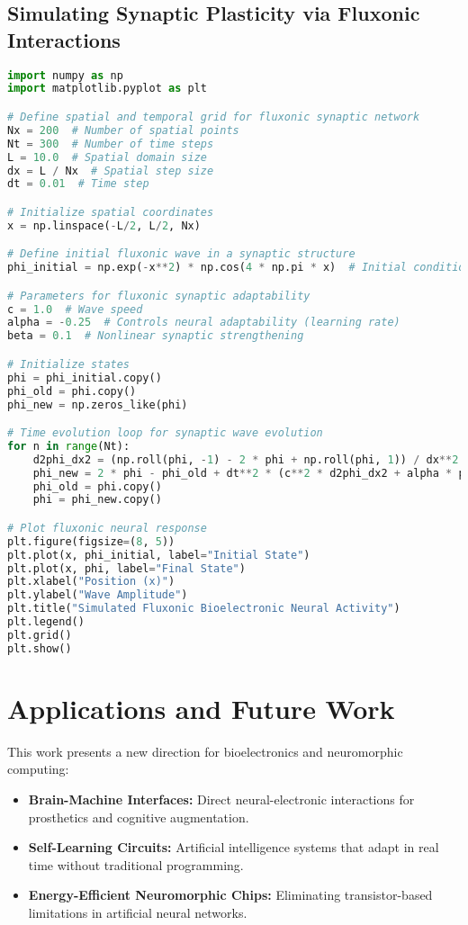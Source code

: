 \documentclass{article}
\begin{document}
\subsection{Simulating Synaptic Plasticity via Fluxonic Interactions}
\begin{lstlisting}[language=Python, caption=Simulating Synaptic Plasticity via Fluxonic Interactions, label=lst:synapse]
import numpy as np
import matplotlib.pyplot as plt

# Define spatial and temporal grid for fluxonic synaptic network
Nx = 200  # Number of spatial points
Nt = 300  # Number of time steps
L = 10.0  # Spatial domain size
dx = L / Nx  # Spatial step size
dt = 0.01  # Time step

# Initialize spatial coordinates
x = np.linspace(-L/2, L/2, Nx)

# Define initial fluxonic wave in a synaptic structure
phi_initial = np.exp(-x**2) * np.cos(4 * np.pi * x)  # Initial condition simulating an active synapse

# Parameters for fluxonic synaptic adaptability
c = 1.0  # Wave speed
alpha = -0.25  # Controls neural adaptability (learning rate)
beta = 0.1  # Nonlinear synaptic strengthening

# Initialize states
phi = phi_initial.copy()
phi_old = phi.copy()
phi_new = np.zeros_like(phi)

# Time evolution loop for synaptic wave evolution
for n in range(Nt):
    d2phi_dx2 = (np.roll(phi, -1) - 2 * phi + np.roll(phi, 1)) / dx**2  # Periodic boundary conditions
    phi_new = 2 * phi - phi_old + dt**2 * (c**2 * d2phi_dx2 + alpha * phi + beta * phi**3)
    phi_old = phi.copy()
    phi = phi_new.copy()

# Plot fluxonic neural response
plt.figure(figsize=(8, 5))
plt.plot(x, phi_initial, label="Initial State")
plt.plot(x, phi, label="Final State")
plt.xlabel("Position (x)")
plt.ylabel("Wave Amplitude")
plt.title("Simulated Fluxonic Bioelectronic Neural Activity")
plt.legend()
plt.grid()
plt.show()
\end{lstlisting}

\section{Applications and Future Work}
This work presents a new direction for bioelectronics and neuromorphic computing:
\begin{itemize}
    \item \textbf{Brain-Machine Interfaces:} Direct neural-electronic interactions for prosthetics and cognitive augmentation.
    \item \textbf{Self-Learning Circuits:} Artificial intelligence systems that adapt in real time without traditional programming.
    \item \textbf{Energy-Efficient Neuromorphic Chips:} Eliminating transistor-based limitations in artificial neural networks.
\end{itemize}
\end{document}
